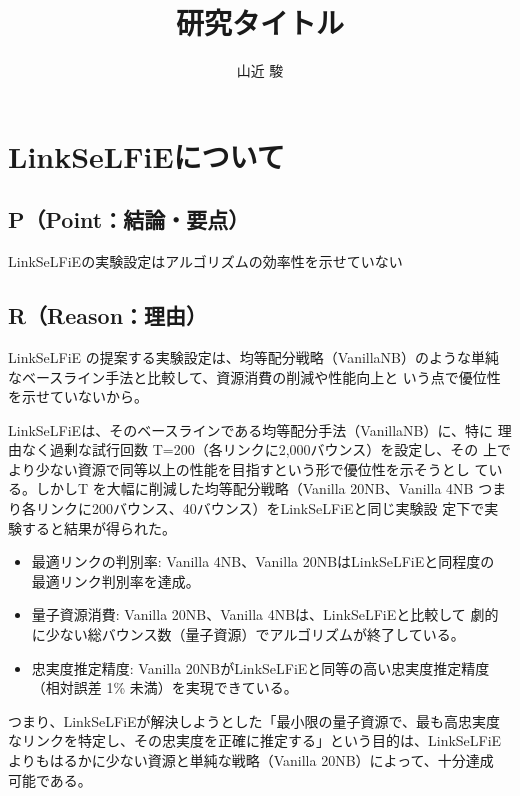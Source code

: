 \documentclass[twocolumn,a4paper,dvipdfmx]{ieicejsp}
\date{}
\title{}
\begin{document}
\title{研究タイトル}
\author{山近 駿}
\maketitle


\section{LinkSeLFiEについて}
\label{sec:org44746fa}
\subsection{P（Point：結論・要点）}
\label{sec:org26e54d2}
LinkSeLFiEの実験設定はアルゴリズムの効率性を示せていない

\subsection{R（Reason：理由）}
\label{sec:org2a17260}
LinkSeLFiE の提案する実験設定は、均等配分戦略（VanillaNB）のような単純
なベースライン手法と比較して、資源消費の削減や性能向上と
いう点で優位性を示せていないから。

LinkSeLFiEは、そのベースラインである均等配分手法（VanillaNB）に、特に
理由なく過剰な試行回数 T=200（各リンクに2,000バウンス）を設定し、その
上でより少ない資源で同等以上の性能を目指すという形で優位性を示そうとし
ている。しかしT を大幅に削減した均等配分戦略（Vanilla 20NB、Vanilla
4NB つまり各リンクに200バウンス、40バウンス）をLinkSeLFiEと同じ実験設
定下で実験すると結果が得られた。

\begin{itemize}
\item 最適リンクの判別率: Vanilla 4NB、Vanilla 20NBはLinkSeLFiEと同程度の
最適リンク判別率を達成。

\item 量子資源消費: Vanilla 20NB、Vanilla 4NBは、LinkSeLFiEと比較して
劇的に少ない総バウンス数（量子資源）でアルゴリズムが終了している。

\item 忠実度推定精度: Vanilla 20NBがLinkSeLFiEと同等の高い忠実度推定精度
（相対誤差 1\% 未満）を実現できている。
\end{itemize}

つまり、LinkSeLFiEが解決しようとした「最小限の量子資源で、最も高忠実度
なリンクを特定し、その忠実度を正確に推定する」という目的は、LinkSeLFiE
よりもはるかに少ない資源と単純な戦略（Vanilla 20NB）によって、十分達成
可能である。
\end{document}
